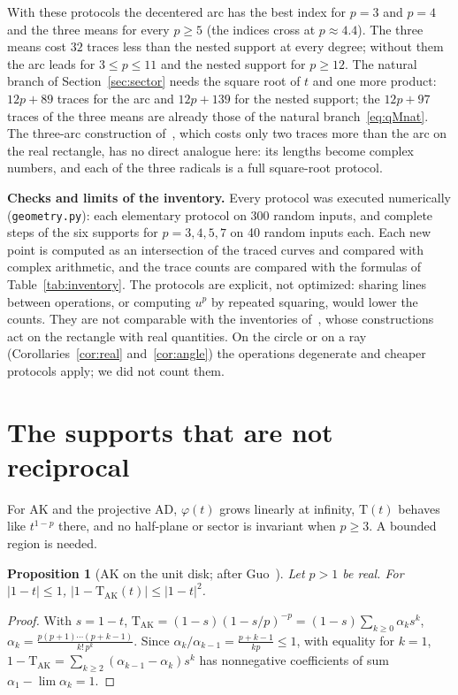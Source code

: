 \documentclass[10pt,a4paper]{article}
\theoremstyle{plain}
\newtheorem{proposition}[theorem]{Proposition}
\theoremstyle{remark}
\numberwithin{equation}{section}
\newcommand{\Tm}{\mathrm{T}}
\begin{document}
With these protocols the decentered arc has the best index for $p=3$ and $p=4$ and the three means
for every $p\ge5$ (the indices cross at $p\approx4.4$). The three means cost $32$ traces less than
the nested support at every degree; without them the arc leads for $3\le p\le11$ and the nested
support for $p\ge12$. The natural branch of Section~\ref{sec:sector}
needs the square root of $t$ and one more product: $12p+89$ traces for the arc and $12p+139$ for the
nested support; the $12p+97$ traces of the three means are already those of the natural
branch~\eqref{eq:qMnat}. The three-arc construction of~\cite{v29}, which costs only two traces more
than the arc on the real rectangle, has no direct analogue here: its lengths become complex
numbers, and each of the three radicals is a full square-root protocol.

\textbf{Checks and limits of the inventory.} Every protocol was executed numerically
(\texttt{geometry.py}): each elementary protocol on 300 random inputs, and complete steps of the
six supports for $p=3,4,5,7$ on 40 random inputs each. Each new point is computed as an
intersection of the traced curves and compared with complex arithmetic, and the trace counts are
compared with the formulas of Table~\ref{tab:inventory}. The protocols are explicit, not optimized:
sharing lines between operations, or computing $u^{p}$ by repeated squaring, would lower the
counts. They are not comparable with the inventories of~\cite{v28,v29}, whose constructions act on the
rectangle with real quantities. On the circle or on a ray (Corollaries~\ref{cor:real}
and~\ref{cor:angle}) the operations degenerate and cheaper protocols apply; we did not count them.

\section{The supports that are not reciprocal}\label{sec:disk}

For AK and the projective AD, $\varphi(t)$ grows linearly at infinity, $\Tm(t)$ behaves like
$t^{1-p}$ there, and no half-plane or sector is invariant when $p\ge3$. A bounded region is needed.

\begin{proposition}[AK on the unit disk; after Guo~\cite{guo10}]\label{prop:newton}
Let $p>1$ be real. For $|1-t|\le1$, $|1-\Tm_{\mathrm{AK}}(t)|\le|1-t|^{2}$.
\end{proposition}

\begin{proof}
With $s=1-t$, $\Tm_{\mathrm{AK}}=(1-s)(1-s/p)^{-p}=(1-s)\sum_{k\ge0}\alpha_ks^{k}$,
$\alpha_k=\frac{p(p+1)\cdots(p+k-1)}{k!\,p^{k}}$. Since $\alpha_k/\alpha_{k-1}=\frac{p+k-1}{kp}\le1$,
with equality for $k=1$, $1-\Tm_{\mathrm{AK}}=\sum_{k\ge2}(\alpha_{k-1}-\alpha_k)s^{k}$ has
nonnegative coefficients of sum $\alpha_1-\lim\alpha_k=1$.
\end{proof}
\end{document}
